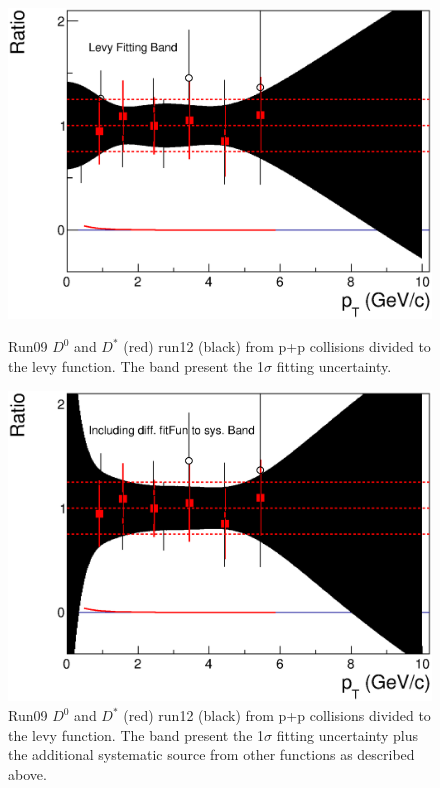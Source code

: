 \begin{figure}[htbp]
\begin{minipage}[htbp]{0.47\linewidth}
\centering
\includegraphics[width=1.0\textwidth,angle=0]{figure/Run14_D0HFT/pp_baseLine_Ratio.eps}
\caption{Run09 $D^{0}$ and $D^*$ (red) run12 (black) from p+p collisions divided to the levy function. The band present the 1$\sigma$ fitting uncertainty. \label{pp_baseLine_ratio}}
\end{minipage}
\hfill
\begin{minipage}[htbp]{0.47\linewidth}
\centering
\includegraphics[width=1.0\textwidth,angle=0]{figure/Run14_D0HFT/pp_baseLine_Ratio3.eps}
\caption{Run09 $D^{0}$ and $D^*$ (red) run12 (black) from p+p collisions divided to the levy function. The band present the 1$\sigma$ fitting uncertainty plus the additional systematic source from other functions as described above. \label{pp_baseLine_ratio_3}}
\end{minipage}
\end{figure}


